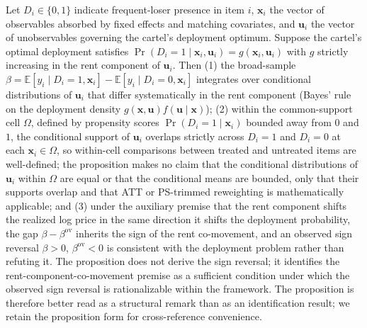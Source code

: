 \begin{proposition}\label{prop:screening_value}
Let $D_i \in \{0,1\}$ indicate frequent-loser presence in item
$i$, $\mathbf{x}_i$ the vector of observables absorbed by fixed
effects and matching covariates, and $\mathbf{u}_i$ the vector
of unobservables governing the cartel's deployment optimum.
Suppose the cartel's optimal deployment satisfies
$\Pr(D_i=1 \mid \mathbf{x}_i, \mathbf{u}_i) = g(\mathbf{x}_i,
\mathbf{u}_i)$ with $g$ strictly increasing in the rent
component of $\mathbf{u}_i$. Then (1) the broad-sample
$\beta = \mathbb{E}[y_i \mid D_i=1, \mathbf{x}_i] -
\mathbb{E}[y_i \mid D_i=0, \mathbf{x}_i]$ integrates over
conditional distributions of $\mathbf{u}_i$ that differ
systematically in the rent component (Bayes' rule on the
deployment density $g(\mathbf{x}, \mathbf{u}) f(\mathbf{u} \mid
\mathbf{x})$); (2) within the common-support cell $\Omega$,
defined by propensity scores $\Pr(D_i=1 \mid \mathbf{x}_i)$
bounded away from $0$ and $1$, the conditional support of
$\mathbf{u}_i$ overlaps strictly across $D_i=1$ and $D_i=0$ at
each $\mathbf{x}_i \in \Omega$, so within-cell comparisons
between treated and untreated items are well-defined; the
proposition makes no claim that the conditional distributions
of $\mathbf{u}_i$ within $\Omega$ are equal or that the
conditional means are bounded, only that their supports
overlap and that ATT or PS-trimmed reweighting is mathematically
applicable; and (3) under the auxiliary premise that the
rent component shifts the realized log price in the same
direction it shifts the deployment probability, the gap
$\beta - \beta^{\text{ov}}$ inherits the sign of the rent
co-movement, and an observed sign reversal $\beta>0$,
$\beta^{\text{ov}}<0$ is consistent with the deployment problem
rather than refuting it. The proposition does not derive the
sign reversal; it identifies the rent-component-co-movement
premise as a sufficient condition under which the observed sign
reversal is rationalizable within the framework. The
proposition is therefore better read as a structural remark
than as an identification result; we retain the proposition
form for cross-reference convenience.
\end{proposition}


